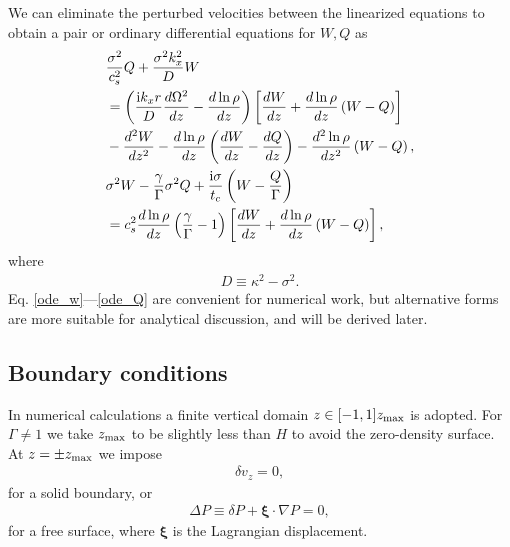 We can eliminate the perturbed velocities between the linearized
equations to obtain a pair or ordinary differential equations
for $W,Q$ as
\begin{align}
  &\frac{\sigma^2}{c_s^2}Q + \frac{\sigma^2k_x^2}{D}W \notag\\ 
  &=\left(\frac{\mathrm{i}
    k_x r}{D}\frac{d\Omega^2}{dz} -
  \frac{d\ln{\rho}}{dz}\right)\left[\frac{dW}{dz} +
  \frac{d\ln{\rho}}{dz}\left(W-Q\right)\right] \notag\\
&- \frac{d^2W}{dz^2} - \frac{d\ln{\rho}}{dz}\left(\frac{dW}{dz} -
  \frac{dQ}{dz}\right) - \frac{d^2\ln{\rho}}{dz^2}\left(W-Q\right),\label{ode_w}\\
&\sigma^2W - \frac{\gamma}{\Gamma}\sigma^2 Q +
\frac{\mathrm{i}\sigma}{t_c}\left(W-\frac{Q}{\Gamma}\right)\notag\\
&=c_s^2\frac{d\ln{\rho}}{dz}\left(\frac{\gamma}{\Gamma} - 1\right) 
\left[\frac{dW}{dz} + \frac{d\ln{\rho}}{dz}\left(W-Q\right)\right],\label{ode_Q} 
\end{align}
where
\begin{align}
  D \equiv \kappa^2 - \sigma^2.
\end{align}
Eq. \ref{ode_w}---\ref{ode_Q} are convenient for numerical work, 
but alternative forms are more suitable for analytical discussion, and 
will be derived later.  

\subsection{Boundary conditions}
In numerical calculations a finite vertical domain $z\in[-1,1]z_\mathrm{max}$
is adopted. For $\Gamma\neq1$ we take $z_\mathrm{max}$ to be slightly less than
$H$ to avoid the zero-density surface. At $z=\pm z_\mathrm{max}$ we impose
\begin{align}
  \delta v_z = 0,
\end{align}
for a solid boundary, or 
\begin{align}
  \Delta P \equiv \delta P + \bm{\xi}\cdot\nabla P= 0,  
\end{align}
for a free surface, where $\bm{\xi}$ is the Lagrangian
displacement.

